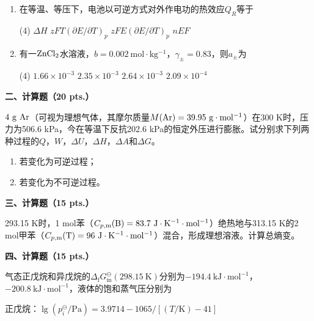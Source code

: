 \begin{enumerate}[label=\arabic*., itemsep=1.5ex]
    \begin{tasks}(4)
    \end{tasks}
    \item 在等温、等压下，电池以可逆方式对外作电功的热效应$Q_R$等于
    \begin{tasks}(4)
        \task $\Delta H$
        \task $zFT(\partial E/\partial T)_p$
        \task $zFE(\partial E/\partial T)_p$
        \task $nEF$
    \end{tasks}
    \item 有一$\ce{ZnCl2}$水溶液，$b=0.002\ \mathrm{mol\cdot kg^{-1}}$，$\gamma_\pm=0.83$，则$a_\pm$为
    \begin{tasks}(4)
        \task $1.66\times10^{-3}$
        \task $2.35\times10^{-3}$
        \task $2.64\times10^{-3}$
        \task $2.09\times10^{-4}$
    \end{tasks}
\end{enumerate}

\vspace{0.5cm}
\noindent\textbf{二、计算题（20 pts.）}

$4\ \mathrm{g}\ \ce{Ar}$（可视为理想气体，其摩尔质量$M(\ce{Ar})=39.95\ \mathrm{g\cdot mol^{-1}}$）在300 K时，压力为506.6 kPa，今在等温下反抗202.6 kPa的恒定外压进行膨胀。试分别求下列两种过程的$Q$，$W$，$\Delta U$，$\Delta H$，$\Delta A$和$\Delta G$。
\begin{enumerate}[label=(\arabic*), itemsep=1ex]
    \item 若变化为可逆过程；
    \item 若变化为不可逆过程。
\end{enumerate}

\vspace{0.5cm}
\noindent\textbf{三、计算题（15 pts.）}

293.15 K时，1 mol苯（$C_{p,\mathrm{m}}(\ce{B})=83.7\ \mathrm{J\cdot K^{-1}\cdot mol^{-1}}$）绝热地与313.15 K的2 mol甲苯（$C_{p,\mathrm{m}}(\ce{T})=96\ \mathrm{J\cdot K^{-1}\cdot mol^{-1}}$）混合，形成理想溶液。计算总熵变。

\vspace{0.5cm}
\noindent\textbf{四、计算题（15 pts.）}

气态正戊烷和异戊烷的$\Delta_\mathrm{f}G_\mathrm{m}^\ominus(298.15\ \mathrm{K})$分别为$-194.4\ \mathrm{kJ\cdot mol^{-1}}$，$-200.8\ \mathrm{kJ\cdot mol^{-1}}$，液体的饱和蒸气压分别为

正戊烷：$\lg(p_i^\ominus/\mathrm{Pa})=3.9714-1065/[(T/\mathrm{K})-41]$

